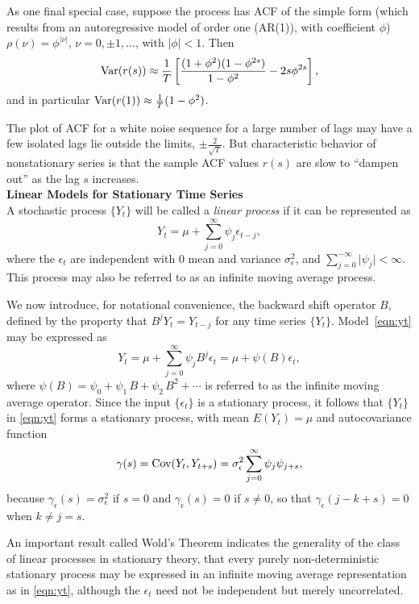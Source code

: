 As one final special case, suppose the process  has ACF of the simple form (which results from an autoregressive model of order one (AR(1)), with coefficient $\phi$) $\rho(\nu) = \phi^{|\nu|}$, $\nu= 0, \pm 1, \ldots$, with $|\phi| < 1$. Then
	\[
	\operatorname{Var}(r(s)) \approx \frac{1}{T} \left[ \frac{(1 + \phi^2) (1 - \phi^{2s})}{1 - \phi^2} - 2s \phi^{2s} \right],
	\]
and in particular $\operatorname{Var}(r(1)) \approx \frac{1}{T} (1 - \phi^2)$.


The plot of ACF for a white noise sequence for a large number of lags may have a few isolated lags lie outside the limits, $\pm \frac{2}{\sqrt{T}}$. But characteristic behavior of nonstationary series is that the sample ACF values $r(s)$ are slow to ``dampen out'' as the lag $s$ increases. \\


\noindent\textbf{Linear Models for Stationary Time Series} \\


A stochastic process $\{ Y_t \}$ will be called a \emph{linear process} if it can be represented as
	\begin{equation} \label{eqn:yt}
          Y_t = \mu + \sum_{j=0}^{\infty}  \psi_j \epsilon_{t-j},
	\end{equation}
where the $\epsilon_t$ are independent with 0 mean and variance $\sigma^2_{\epsilon}$, and $\sum_{j=0}^{-\infty} \lvert \psi_j \rvert < \infty$. This process may also be referred to as an infinite moving average process.


We now introduce, for notational convenience, the backward shift operator $B$, defined by the property that $B^j Y_t = Y_{t-j}$ for any time series $\{ Y_t \}$. Model~\eqref{eqn:yt} may be expressed as
	\[
	Y_t = \mu + \sum_{j=0}^{\infty} \psi_j B^j \epsilon_t = \mu + \psi(B) \epsilon_t,
	\]
where $\psi(B) = \psi_0 + \psi_1 \, B + \psi_2 \, B^2 + \cdots$ is referred to as the infinite moving average operator. Since the input $\{\epsilon_t\}$ is a stationary process, it follows that $\{ Y_t \}$ in \eqref{eqn:yt} forms a stationary process, with mean $E(Y_t)=\mu$ and autocovariance function
	\begin{equation} \label{eqn:covyt}
	\gamma(s)= \cov(Y_t, Y_{t+s})= \sigma^2_{\epsilon} \sum_{j=0}^{\infty} \psi_j \psi_{j+s},
	\end{equation}      
because $\gamma_\epsilon(s) = \sigma^2_\epsilon$ if $s=0$ and $\gamma_\epsilon(s) = 0$ if $s \neq 0$, so that $\gamma_\epsilon(j - k + s) = 0$ when $k \neq j = s$.
	

An important result called Wold's Theorem indicates the generality of the class of linear processes in stationary theory, that every purely non-deterministic stationary process may be expressed in an infinite moving average representation as in \eqref{eqn:yt}, although the $\epsilon_t$ need not be independent but merely uncorrelated.	


